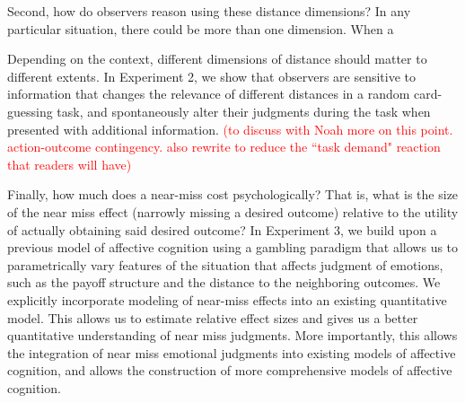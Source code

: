 \documentclass[10pt,letterpaper]{article}
\begin{document}

Second, how do observers reason using these distance dimensions? In any particular situation, there could be more than one dimension. When a 


Depending on the context, different dimensions of distance should matter to different extents. In Experiment 2, we show that observers are sensitive to information that changes the relevance of different distances in a random card-guessing task, and spontaneously alter their judgments during the task when presented with additional information.
\textcolor{red}{(to discuss with Noah more on this point. action-outcome contingency. also rewrite to reduce the ``task demand" reaction that readers will have)}

Finally, how much does a near-miss cost psychologically? That is, what is the size of the near miss effect (narrowly missing a desired outcome) relative to the utility of actually obtaining said desired outcome? In Experiment 3, we build upon a previous model of affective cognition \cite{OngAffCog} using a gambling paradigm that allows us to parametrically vary features of the situation that affects judgment of emotions, such as the payoff structure and the distance to the neighboring outcomes. We explicitly incorporate modeling of near-miss effects into an existing quantitative model. This allows us to estimate relative effect sizes and gives us a better quantitative understanding of near miss judgments. More importantly, this allows the integration of near miss emotional judgments into existing models of affective cognition, and allows the construction of more comprehensive models of affective cognition.  








\end{document}
